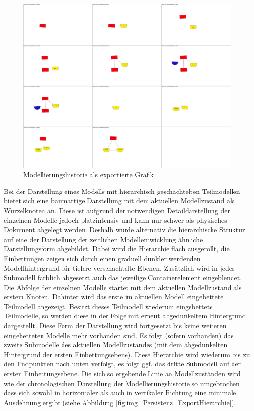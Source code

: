 \begin{figure}[htbp]
	\centering
		\includegraphics[width=15cm]{img/Persistenz/ExportHistorie.png}
	\caption{Modellierungshistorie als exportierte Grafik}
	\label{fig:img_Persistenz_ExportHistorie}
\end{figure}

Bei der Darstellung eines Modells mit hierarchisch geschachtelten Teilmodellen bietet sich eine baumartige Darstellung mit dem aktuellen Modellzustand als Wurzelknoten an. Diese ist aufgrund der notwendigen Detaildarstellung der einzelnen Modelle jedoch platzintensiv und kann nur schwer als physisches Dokument abgelegt werden. Deshalb wurde alternativ die hierarchische Struktur auf eine der Darstellung der zeitlichen Modellentwicklung ähnliche Darstellungsform abgebildet. Dabei wird die Hierarchie flach ausgerollt, die Einbettungen zeigen sich durch einen graduell dunkler werdenden Modellhintergrund für tiefere verschachtelte Ebenen. Zusätzlich wird in jedes Submodell farblich abgesetzt auch das jeweilige Containerelement eingeblendet. Die Abfolge der einzelnen Modelle startet mit dem aktuellen Modellzustand als erstem Knoten. Dahinter wird das erste im aktuellen Modell eingebettete Teilmodell angezeigt. Besitzt dieses Teilmodell wiederum eingebettete Teilmodelle, so werden diese in der Folge mit erneut abgedunkeltem Hintergrund dargestellt. Diese Form der Darstellung wird fortgesetzt bis keine weiteren eingebetteten Modelle mehr vorhanden sind. Es folgt (sofern vorhanden) das zweite Submodelle des aktuellen Modellzustandes (mit dem abgedunkelten Hintergrund der ersten Einbettungsebene). Diese Hierarchie wird wiederum bis zu den Endpunkten nach unten verfolgt, es folgt ggf. das dritte Submodell auf der ersten Einbettungsebene. Die sich so ergebende Linie an Modellzuständen wird wie der chronologischen Darstellung der Modellierungshistorie so umgebrochen dass sich sowohl in horizontaler als auch in vertikaler Richtung eine minimale Ausdehnung ergibt (siehe Abbildung \ref{fig:img_Persistenz_ExportHierarchie}).

